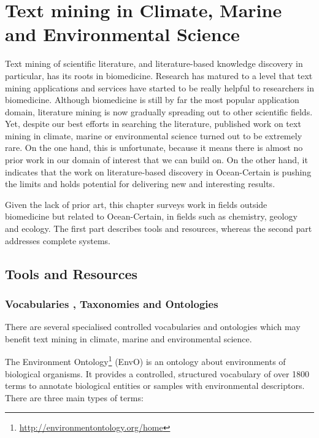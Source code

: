 \chapter{Text mining in Climate, Marine and Environmental Science}


Text mining of scientific literature, and literature-based knowledge discovery in particular, has its roots in biomedicine.
Research has matured to a level that text mining applications and services have started to be really helpful to researchers in biomedicine.
Although biomedicine is still by far the most popular application domain, literature mining is now gradually spreading out to other scientific fields.
Yet, despite our best efforts in searching the literature, published work on text mining in climate, marine or environmental science turned out to be extremely rare.
On the one hand, this is unfortunate, because it means there is almost no prior work in our domain of interest that we can build on.
On the other hand, it indicates that the work on literature-based discovery in Ocean-Certain is pushing the limits and holds potential for delivering new and interesting results.

Given the lack of prior art, this chapter surveys work in fields outside biomedicine but related to Ocean-Certain, in fields such as chemistry, geology and ecology.
The first part describes tools and resources, whereas the second part addresses complete systems. 

\section{Tools and Resources}

\subsection{Vocabularies , Taxonomies and Ontologies}

There are several specialised controlled vocabularies and ontologies which may benefit text mining in climate, marine and environmental science.
 
The Environment Ontology\footnote{\url{http://environmentontology.org/home}} (EnvO) is an ontology about environments  \citep{Buttigieg2013Environment} of biological organisms.
It provides a controlled, structured vocabulary of over 1800 terms to annotate biological entities or samples with environmental descriptors.
There are three main types of terms:

